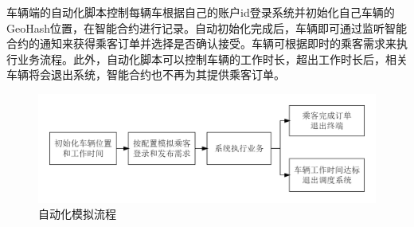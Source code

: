 车辆端的自动化脚本控制每辆车根据自己的账户id登录系统并初始化自己车辆的GeoHash位置，在智能合约进行记录。自动初始化完成后，车辆即可通过监听智能合约的通知来获得乘客订单并选择是否确认接受。车辆可根据即时的乘客需求来执行业务流程。此外，自动化脚本可以控制车辆的工作时长，超出工作时长后，相关车辆将会退出系统，智能合约也不再为其提供乘客订单。
\begin{figure}
  \centering
  \includegraphics[width=1.0\textwidth]{figures/自动化流程}
  \caption{自动化模拟流程}\label{fig:auto}
\end{figure}

